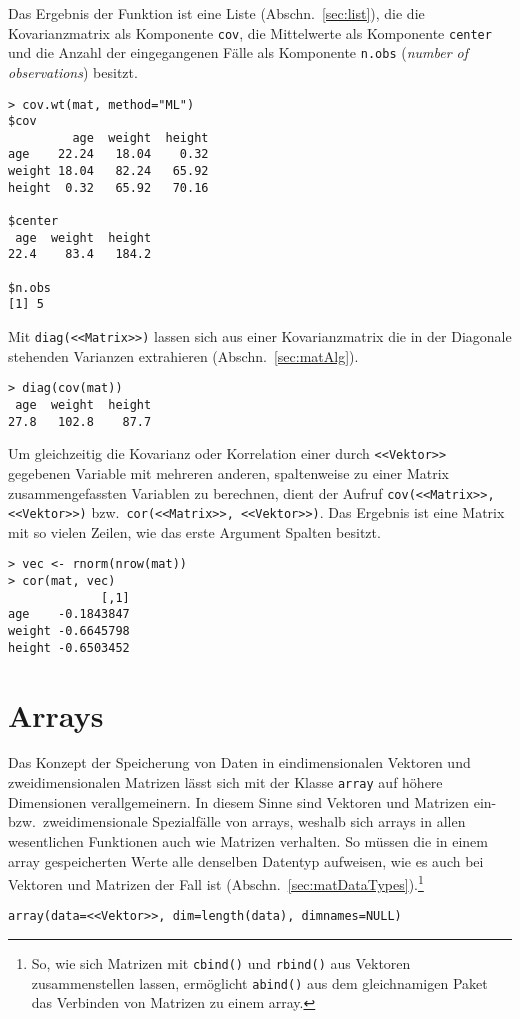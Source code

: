 Das Ergebnis der Funktion ist eine Liste (Abschn.\ \ref{sec:list}), die die Kovarianzmatrix als Komponente \lstinline!cov!, die Mittelwerte als Komponente \lstinline!center! und die Anzahl der eingegangenen Fälle als Komponente \lstinline!n.obs! (\emph{number of observations}) besitzt.
\begin{lstlisting}
> cov.wt(mat, method="ML")
$cov
         age  weight  height
age    22.24   18.04    0.32
weight 18.04   82.24   65.92
height  0.32   65.92   70.16

$center
 age  weight  height
22.4    83.4   184.2

$n.obs
[1] 5
\end{lstlisting}

Mit \lstinline!diag(<<Matrix>>)! lassen sich aus einer Kovarianzmatrix die in der Diagonale stehenden Varianzen extrahieren (Abschn.\ \ref{sec:matAlg}).
\begin{lstlisting}
> diag(cov(mat))
 age  weight  height
27.8   102.8    87.7
\end{lstlisting}

Um gleichzeitig die Kovarianz oder Korrelation einer durch \lstinline!<<Vektor>>! gegebenen Variable mit mehreren anderen, spaltenweise zu einer Matrix zusammengefassten Variablen zu berechnen, dient der Aufruf \lstinline!cov(<<Matrix>>, <<Vektor>>)! bzw.\ \lstinline!cor(<<Matrix>>, <<Vektor>>)!. Das Ergebnis ist eine Matrix mit so vielen Zeilen, wie das erste Argument Spalten besitzt.
\begin{lstlisting}
> vec <- rnorm(nrow(mat))
> cor(mat, vec)
             [,1]
age    -0.1843847
weight -0.6645798
height -0.6503452
\end{lstlisting}

\section{Arrays}
\label{sec:array}

Das Konzept der Speicherung von Daten in eindimensionalen Vektoren und zweidimensionalen Matrizen lässt sich mit der Klasse \lstinline!array! auf höhere Dimensionen verallgemeinern. In diesem Sinne sind Vektoren und Matrizen ein- bzw.\ zweidimensionale Spezialfälle von arrays, weshalb sich arrays in allen wesentlichen Funktionen auch wie Matrizen verhalten. So müssen die in einem array gespeicherten Werte alle denselben Datentyp aufweisen, wie es auch bei Vektoren und Matrizen der Fall ist (Abschn.\ \ref{sec:matDataTypes}).\footnote{So, wie sich Matrizen mit \lstinline!cbind()! und \lstinline!rbind()! aus Vektoren zusammenstellen lassen, ermöglicht \lstinline!abind()! aus dem gleichnamigen Paket \cite{Plate2004} das Verbinden von Matrizen zu einem array.}
\begin{lstlisting}
array(data=<<Vektor>>, dim=length(data), dimnames=NULL)
\end{lstlisting}

